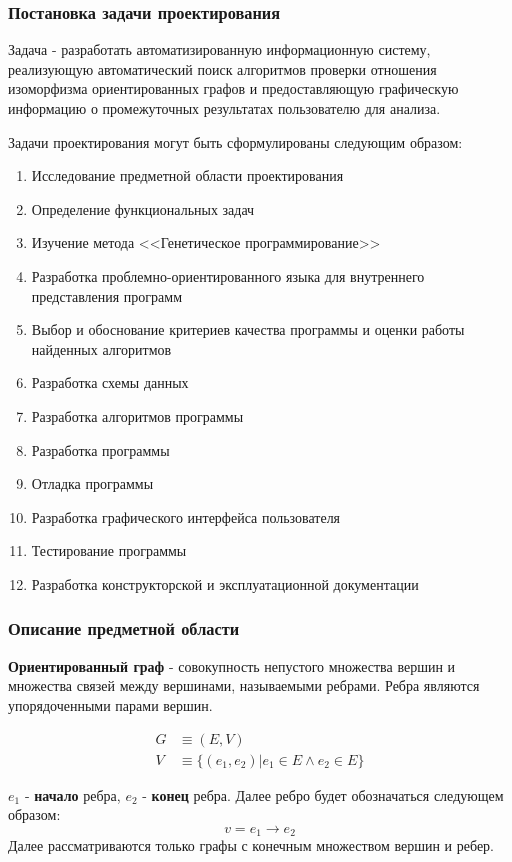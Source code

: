 \documentclass[russian,utf8,emptystyle]{eskdtext}
\begin{document}
\begin{spacing}{1.5}
\subsubsection{Постановка задачи проектирования}
Задача - разработать автоматизированную информационную систему, реализующую автоматический поиск алгоритмов проверки отношения изоморфизма ориентированных графов и предоставляющую графическую информацию о промежуточных результатах пользователю для анализа.

Задачи проектирования могут быть сформулированы следующим образом:
\begin{enumerate}
\item Исследование предметной области проектирования
\item Определение функциональных задач
\item Изучение метода <<Генетическое программирование>>
\item Разработка проблемно-ориентированного языка для внутреннего представления программ
\item Выбор и обоснование критериев качества программы и оценки работы найденных алгоритмов
\item Разработка схемы данных
\item Разработка алгоритмов программы
\item Разработка программы
\item Отладка программы
\item Разработка графического интерфейса пользователя
\item Тестирование программы
\item Разработка конструкторской и эксплуатационной документации
\end{enumerate}

\subsubsection{Описание предметной области}
\textbf{Ориентированный граф} - совокупность непустого множества вершин и множества связей между вершинами, называемыми ребрами. Ребра являются упорядоченными парами вершин.

\begin{align*}
G &\equiv ( E, V ) \\ 
V &\equiv \{ (e_1, e_2) | e_1 \in E \wedge e_2 \in E \}
\end{align*}

$e_1$ - \textbf{начало} ребра, $e_2$ - \textbf{конец} ребра. Далее ребро будет обозначаться следующем образом:
$$
v = e_1 \rightarrow e_2
$$
Далее рассматриваются только графы с конечным множеством вершин и ребер.


\end{spacing}
\end{document}
